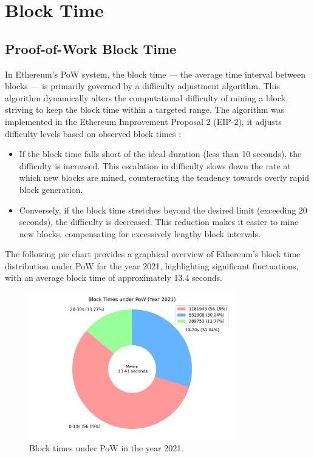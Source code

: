 \section{Block Time}

\subsection{Proof-of-Work Block Time}
\label{diff_adjustment}

In Ethereum's PoW system, the block time — the average time
interval between blocks — is primarily governed by a difficulty adjustment
algorithm. This algorithm dynamically alters the computational difficulty of
mining a block, striving to keep the block time within a targeted range.
The algorithm was implemented in the Ethereum Improvement Proposal 2 (EIP-2),
it adjusts difficulty levels based on observed block times \cite{eip-2}:

\begin{itemize}
  \item If the block time falls short of the ideal duration (less
    than 10 seconds), the difficulty is increased. This escalation in
    difficulty slows down the rate at which new blocks are mined,
    counteracting the tendency towards overly rapid block generation.

  \item Conversely, if the block time stretches beyond the desired limit (exceeding
    20 seconds), the difficulty is decreased. This reduction makes it easier to
    mine new blocks, compensating for excessively lengthy block intervals.
\end{itemize}

The following pie chart provides a graphical overview of Ethereum's block time
distribution under PoW for the year 2021, highlighting significant
fluctuations, with an average block time of approximately 13.4 seconds.


\begin{figure}[H]
  \centering
  \includegraphics[width=0.8\textwidth]{block_time_analysis/pow_block_time_pie_chart.png}
  \caption{Block times under PoW in the year 2021.}
  \label{fig:block_time_analysis_pow}
\end{figure}

